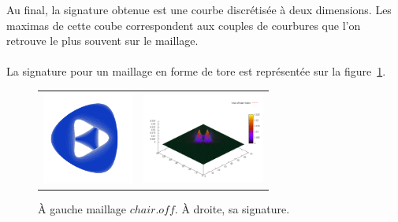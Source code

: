 \documentclass{llncs}
\begin{document}
Au final, la signature obtenue est une courbe discrétisée à deux dimensions. Les maximas de cette coube correspondent aux couples de courbures que l'on retrouve le plus souvent sur le maillage.
\\\\
La signature pour un maillage en forme de tore est représentée sur la figure~\ref{signature_tore}.
\begin{figure}[tb]
    \centering
    \begin{tabular}{cc}
      \includegraphics[width=3cm]{img/chair.png} &
      \includegraphics[width=4cm]{img/chair_taubin.png} \\
    \end{tabular}
    \caption{\`A gauche maillage $chair.off$. \`A droite, sa signature.}
\label{signature_tore}
\end{figure}
\end{document}
